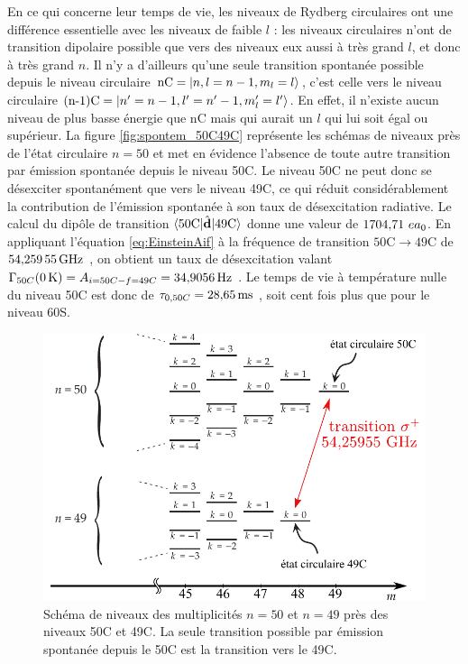 En ce qui concerne leur temps de vie, les niveaux de Rydberg circulaires ont une différence essentielle avec les niveaux de faible $l$ : les niveaux circulaires n'ont de transition dipolaire possible que vers des niveaux eux aussi à très grand $l$, et donc à très grand $n$.
Il n'y a d'ailleurs qu'une seule transition spontanée possible depuis le niveau circulaire $\text{nC}=\ket{n,l=n-1,m_l=l}$, c'est celle vers le niveau circulaire $\text{(n-1)C}=\ket{n'=n-1,l'=n'-1,m_l'=l'}$.
En effet, il n'existe aucun niveau de plus basse énergie que $\mathrm{nC}$ mais qui aurait un $l$ qui lui soit égal ou supérieur.
La figure \eqref{fig:spontem_50C49C} représente les schémas de niveaux près de l'état circulaire $n=50$ et met en évidence l'absence de toute autre transition par émission spontanée depuis le niveau 50C.
Le niveau 50C ne peut donc se désexciter spontanément que vers le niveau 49C, ce qui réduit considérablement la contribution de l'émission spontanée à son taux de désexcitation radiative.
Le calcul du dipôle de transition $\braket{50\text{C}|\hat{\mathbf{d}}|49\text{C}}$ donne une valeur de $\numv{1704.71} e a_0$.
En appliquant l'équation \eqref{eq:EinsteinAif} à la fréquence de transition $\mathrm{50C}\rightarrow \mathrm{49C}$ de $\SIv{54.25955}{\giga\hertz}$, on obtient un taux de désexcitation valant $\Gamma_{50C}(\SIvv{0}{\kelvin}) = A_{i=50C-f=49C} = \SIv{34.9056}{\hertz}$.
Le temps de vie à température nulle du niveau 50C est donc de $\tau_{0,50C} = \SIv{28.65}{\ms}$, soit cent fois plus que pour le niveau 60S.
\begin{figure}[!h]
	\centering
	\includegraphics[width=0.7\linewidth]{figures/spontem_50C49C}
	\caption[Schéma de niveaux 50C-49C]{Schéma de niveaux des multiplicités $n=50$ et $n=49$ près des niveaux 50C et 49C. La seule transition possible par émission spontanée depuis le 50C est la transition vers le 49C.}
	\label{fig:spontem_50C49C}
\end{figure}

